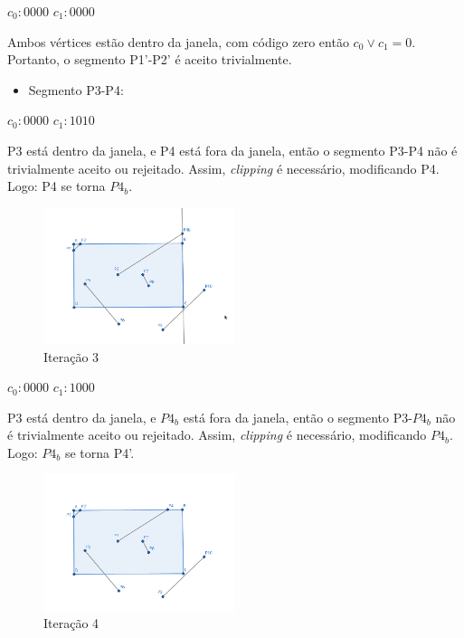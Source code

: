 \documentclass[12pt]{article}
\begin{document}
$c_0: 0000$ \hspace{1cm} $c_1: 0000$

Ambos vértices estão dentro da janela, com código zero então $c_0 \lor c_1 = 0$. Portanto, o segmento P1'-P2' é aceito trivialmente.

\begin{itemize}
    \item Segmento P3-P4:
\end{itemize}
$c_0: 0000$ \hspace{1cm} $c_1: 1010$

P3 está dentro da janela, e P4 está fora da janela, então o segmento P3-P4 não é trivialmente aceito ou rejeitado. Assim, \textit{clipping} é necessário, modificando P4. Logo: P4 se torna $P4_b$.

\begin{figure}[H]
    \centering
    \includegraphics[width=0.5\textwidth]{images/4/4it3.png}
    \caption*{Iteração 3}
\end{figure}

$c_0: 0000$ \hspace{1cm} $c_1: 1000$

P3 está dentro da janela, e $P4_b$ está fora da janela, então o segmento P3-$P4_b$ não é trivialmente aceito ou rejeitado. Assim, \textit{clipping} é necessário, modificando $P4_b$. Logo: $P4_b$ se torna P4'.

\begin{figure}[H]
    \centering
    \includegraphics[width=0.5\textwidth]{images/4/4it4.png}
    \caption*{Iteração 4}
\end{figure}
\end{document}
